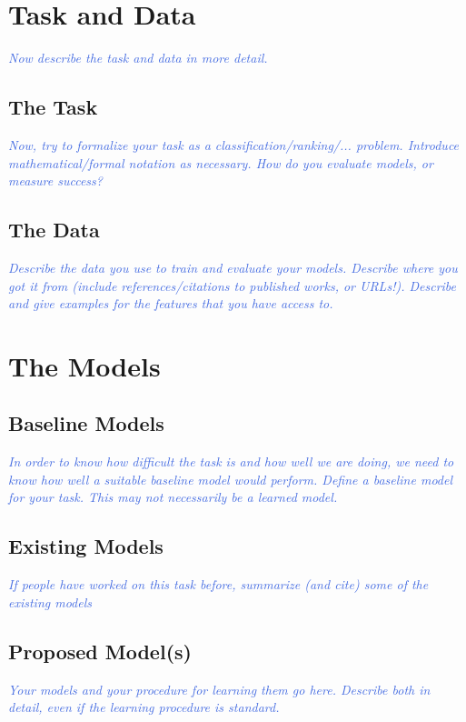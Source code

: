 \documentclass[11pt,letterpaper]{article}
\newcommand{\blue}[1]{\textcolor{RoyalBlue}{#1}}
\newcommand{\instructions}[1]{\blue{\textit{#1}}}
\begin{document}
\section{Task and Data}
\label{sec:taskAndData}
\instructions{Now describe the task and data in more detail.}

\subsection{The Task}
\label{sec:task}
\instructions{Now, try to formalize your task as a classification/ranking/... problem. Introduce mathematical/formal notation as necessary. How do you evaluate models, or measure success?}

\subsection{The Data}
\label{sec:data}
\instructions{Describe the data you use to train and evaluate your models. Describe where you got it from (include references/citations to published works, or URLs!). Describe and give examples for the features that you have access to.} 


\section{The Models}
\label{sec:models}

\subsection{Baseline Models}
\label{sec:baseline-models}
\instructions{In order to know how difficult the task is and how well we are doing, we need to know how well a suitable baseline model would perform. Define a baseline model for your task. This may not necessarily be a learned model.}

\subsection{Existing Models}
\label{sec:existing-models}
\instructions{If people have worked on this task before, summarize (and cite) some of the existing models} 

\subsection{Proposed Model(s)}
\label{sec:proposed-models}
\instructions{Your models and your procedure for learning them go here. Describe both in detail, even if the learning procedure is standard.}
\end{document}

